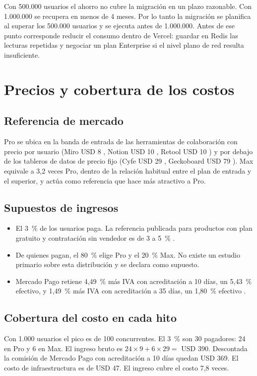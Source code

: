 Con 500.000 usuarios el ahorro no cubre la migración en un plazo razonable. Con 1.000.000 se recupera en menos de 4 meses. Por lo tanto la migración se planifica al superar los 500.000 usuarios y se ejecuta antes de 1.000.000. Antes de ese punto corresponde reducir el consumo dentro de Vercel: guardar en Redis las lecturas repetidas y negociar un plan Enterprise si el nivel plano de red resulta insuficiente.

\section{Precios y cobertura de los costos}

\subsection{Referencia de mercado}
Pro se ubica en la banda de entrada de las herramientas de colaboración con precio por usuario (Miro USD 8 \cite{miro_pricing}, Notion USD 10 \cite{notion_pricing}, Retool USD 10 \cite{retool_pricing}) y por debajo de los tableros de datos de precio fijo (Cyfe USD 29 \cite{cyfe_pricing}, Geckoboard USD 79 \cite{geckoboard_pricing}). Max equivale a 3,2 veces Pro, dentro de la relación habitual entre el plan de entrada y el superior, y actúa como referencia que hace más atractivo a Pro.

\subsection{Supuestos de ingresos}
\begin{itemize}
  \item El 3~\% de los usuarios paga. La referencia publicada para productos con plan gratuito y contratación sin vendedor es de 3 a 5~\% \cite{lenny_conversion, chartmogul_conversion}.
  \item De quienes pagan, el 80~\% elige Pro y el 20~\% Max. No existe un estudio primario sobre esta distribución y se declara como supuesto.
  \item Mercado Pago retiene 4,49~\% más IVA con acreditación a 10 días, un 5,43~\% efectivo, y 1,49~\% más IVA con acreditación a 35 días, un 1,80~\% efectivo \cite{mercadopago_costos}.
\end{itemize}

\subsection{Cobertura del costo en cada hito}
Con 1.000 usuarios el pico es de 100 concurrentes. El 3~\% son 30 pagadores: 24 en Pro y 6 en Max. El ingreso bruto es $24 \times 9 + 6 \times 29 = $ USD 390. Descontada la comisión de Mercado Pago con acreditación a 10 días quedan USD 369. El costo de infraestructura es de USD 47. El ingreso cubre el costo 7,8 veces.

